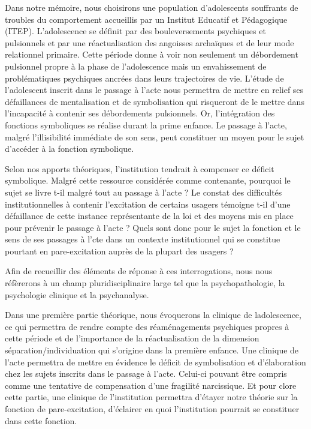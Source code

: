\documentclass[12pt, a4paper]{book}
\begin{document}
\begin{spacing}{1.5}
Dans notre mémoire, nous choisirons une population d’adolescents souffrants de troubles du comportement accueillis par un Institut Educatif et Pédagogique (ITEP). L'adolescence se définit par des bouleversements psychiques et pulsionnels et par une réactualisation des angoisses archaïques et  de leur mode relationnel primaire. Cette période donne à voir non seulement un débordement pulsionnel propre à la phase de l'adolescence mais un envahissement de problématiques psychiques ancrées dans leurs trajectoires de vie. L'étude de l'adolescent inscrit dans le passage à l'acte nous permettra de mettre en relief ses défaillances de mentalisation et de symbolisation qui risqueront de le mettre dans l'incapacité à contenir ses débordements pulsionnels.  Or, l'intégration des fonctions symboliques se réalise durant la prime enfance. Le passage à l'acte, malgré l'illisibilité immédiate de son sens, peut constituer un moyen pour le sujet d'accéder à la fonction symbolique.

Selon nos apports théoriques, l'institution tendrait à compenser ce déficit symbolique. Malgré cette ressource considérée comme contenante, pourquoi le sujet se livre t-il malgré tout  au passage à l'acte ? Le constat des difficultés institutionnelles à contenir l'excitation de certains usagers témoigne t-il d’une défaillance de cette instance représentante de la loi et des moyens mis en place pour prévenir le passage à l'acte ? Quels sont donc pour le sujet la fonction et le sens de ses passages à l’cte dans un contexte institutionnel qui se constitue pourtant en  pare-excitation auprès de la plupart des usagers ?   

Afin de recueillir des éléments de réponse à ces interrogations,  nous nous réfèrerons à un champ pluridisciplinaire large tel que la psychopathologie, la psychologie clinique et la psychanalyse.

Dans une première partie théorique, nous évoquerons la clinique de ladolescence, ce qui permettra de rendre compte des réaménagements psychiques propres à cette période et de l'importance de la réactualisation de la dimension séparation/individuation qui s'origine dans la première enfance. Une clinique de l'acte permettra de mettre en évidence le déficit de symbolisation et d'élaboration chez les sujets inscrits dans le passage à l'acte. Celui-ci pouvant être compris comme une tentative de compensation d’une fragilité narcissique. Et pour clore cette partie, une clinique de l'institution permettra d'étayer notre théorie sur la fonction de pare-excitation, d'éclairer en quoi l'institution pourrait se constituer dans cette fonction. 


\end{spacing}
\end{document}
